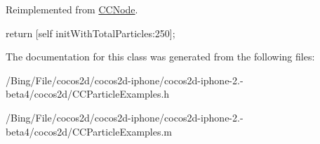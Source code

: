 Reimplemented from \hyperlink{class_c_c_node_ad789cad83aca65c130abd4452d1bc081}{C\-C\-Node}.


\begin{DoxyCode}
{
        return [self initWithTotalParticles:250];
}
\end{DoxyCode}


The documentation for this class was generated from the following files\-:\begin{DoxyCompactItemize}
\item 
/\-Bing/\-File/cocos2d/cocos2d-\/iphone/cocos2d-\/iphone-\/2.-\/beta4/cocos2d/C\-C\-Particle\-Examples.\-h\item 
/\-Bing/\-File/cocos2d/cocos2d-\/iphone/cocos2d-\/iphone-\/2.-\/beta4/cocos2d/C\-C\-Particle\-Examples.\-m\end{DoxyCompactItemize}
